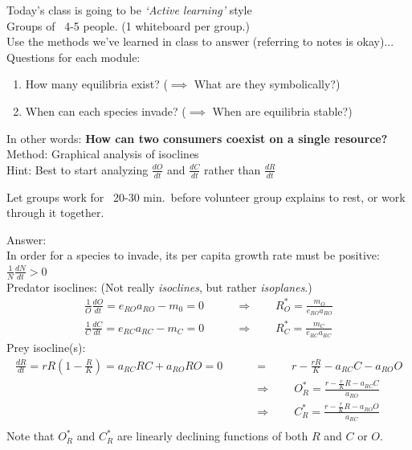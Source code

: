 \documentclass{article}
\newcommand{\note}[1]{\colorbox{gray!30}{#1}}
\newcommand{\ind}{\-\hspace{1cm}}
\begin{document}
Today's class is going to be \emph{`Active learning'} style\\
\ind \note{Groups of ~4-5 people.  (1 whiteboard per group.)}\\

Use the methods we've learned in class to answer (\note{referring to notes is okay})...\\
Questions for each module:
\begin{enumerate}
	\item How many equilibria exist? ($\implies$ What are they symbolically?)
	\item When can each species invade? ($\implies$ When are equilibria stable?)
\end{enumerate}

In other words: \textbf{How can two consumers coexist on a single resource?}\\

Method: Graphical analysis of isoclines\\

Hint:  Best to start analyzing $\frac{dO}{dt}$ and $\frac{dC}{dt}$ rather than $\frac{dR}{dt}$\\

\dotfill

\note{Let groups work for ~20-30 min.~before volunteer group explains to rest, or work through it together.}

\dotfill

\pagebreak

\note{Answer:}\\
In order for a species to invade, its per capita growth rate must be positive:  $\frac{1}{N}\frac{dN}{dt}>0$\\

Predator isoclines: (Not really \emph{isoclines}, but rather \emph{isoplanes}.)
\begin{align*}
	\frac{1}{O}\frac{dO}{dt} = e_{RO}a_{RO}-m_0 = 0 & \qquad \Rightarrow  \qquad R_O^* = \frac{m_O}{e_{RO}a_{RO}}\\
	\frac{1}{C}\frac{dC}{dt} = e_{RC}a_{RC}-m_C = 0 & \qquad \Rightarrow  \qquad R_C^* = \frac{m_C}{e_{RC}a_{RC}}
\end{align*}
Prey isocline(s):
\begin{align*}
	\frac{dR}{dt}=rR\left(1-\frac{R}{K}\right) = a_{RC}RC + a_{RO}RO = 0  & \qquad =  \qquad r-\frac{rR}{K}-a_{RC}C - a_{RO}O\\
	& \qquad \Rightarrow  \qquad O_R^* = \frac{r-\tfrac{r}{K}R-a_{RC}C}{a_{RO}}\\
	& \qquad \Rightarrow  \qquad C_R^* = \frac{r-\tfrac{r}{K}R-a_{RO}O}{a_{RC}}\\
\end{align*}
Note that $O_R^*$ and $C_R^*$ are linearly declining functions of both $R$ and $C$ or $O$.
\end{document}
